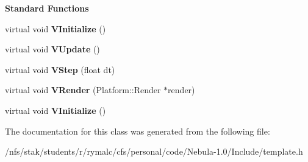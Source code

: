 \begin{Indent}{\bf Standard Functions}\par
{\em \label{_amgrp73a6f6f6732ceea086632f66fc34a9e7}
 }\begin{DoxyCompactItemize}
\item 
\hypertarget{classtemp_ac4a474b521c6be56ebed93bc4ff618ff}{
virtual void {\bfseries VInitialize} ()}
\label{classtemp_ac4a474b521c6be56ebed93bc4ff618ff}

\item 
\hypertarget{classtemp_a3caa973932aede941edce2b9c0d6a937}{
virtual void {\bfseries VUpdate} ()}
\label{classtemp_a3caa973932aede941edce2b9c0d6a937}

\item 
\hypertarget{classtemp_a2faa8cf40d589abc8de3f7e016406e61}{
virtual void {\bfseries VStep} (float dt)}
\label{classtemp_a2faa8cf40d589abc8de3f7e016406e61}

\item 
\hypertarget{classtemp_adb672d28388265cc59c1a8a7472c395a}{
virtual void {\bfseries VRender} (Platform::Render $\ast$render)}
\label{classtemp_adb672d28388265cc59c1a8a7472c395a}

\item 
\hypertarget{classtemp_ac4a474b521c6be56ebed93bc4ff618ff}{
virtual void {\bfseries VInitialize} ()}
\label{classtemp_ac4a474b521c6be56ebed93bc4ff618ff}

\end{DoxyCompactItemize}
\end{Indent}


The documentation for this class was generated from the following file:\begin{DoxyCompactItemize}
\item 
/nfs/stak/students/r/rymalc/cfs/personal/code/Nebula-\/1.0/Include/template.h\end{DoxyCompactItemize}
